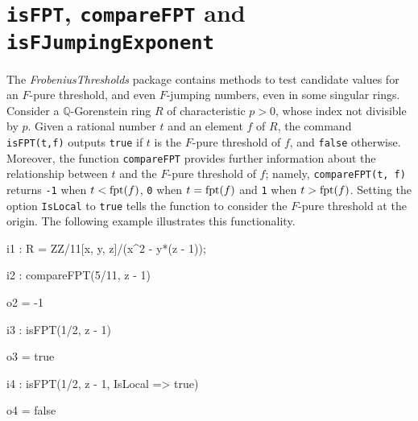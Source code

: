 \documentclass{amsart}
\begin{document}
%
%

\section{{\tt isFPT}, {\tt compareFPT} and {\tt isFJumpingExponent}}
\label{sec.IsFPT}

The \emph{FrobeniusThresholds} package contains methods to 
 test candidate values for an $F$-pure threshold, and even $F$-jumping numbers, even in some singular rings.  
Consider a  $\mathbb{Q}$-Gorenstein ring $R$ of characteristic $p>0$, whose index not divisible by $p$.
Given a rational number $t$ and an element $f$ of $R$, the command {\tt isFPT(t,f)} outputs {\tt true} if $t$ is the $F$-pure threshold of $f$, and {\tt false} otherwise. 
Moreover, the function {\tt compareFPT} provides further information about the relationship between $t$ and the $F$-pure threshold of $f$; namely, 
{\tt compareFPT(t, f)} returns {\tt-1} when $t < \operatorname{{fpt}}(f)$, {\tt 0} when $t = \operatorname{{fpt}}(f)$ and {\tt 1} when $t > \operatorname{{fpt}}(f)$.
Setting the option {\tt IsLocal} to {\tt true} tells the function to consider the $F$-pure threshold at the origin.
The following example illustrates this functionality. 

{\small
{}
\begin{MyVerbatim}

i1 : R = ZZ/11[x, y, z]/(x^2 - y*(z - 1));

i2 : compareFPT(5/11, z - 1)

o2 = -1

i3 : isFPT(1/2, z - 1)

o3 = true

i4 : isFPT(1/2, z - 1, IsLocal => true)

o4 = false
\end{MyVerbatim}
}
\medspace
\end{document}
